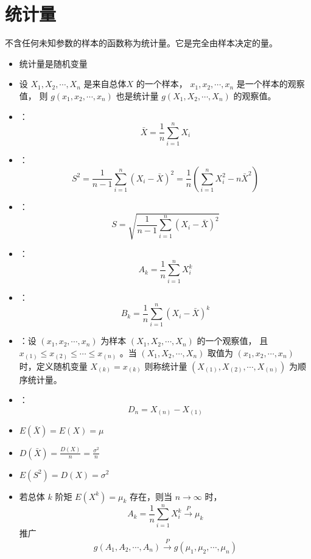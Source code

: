\section{统计量}

 不含任何未知参数的样本的函数称为统计量。它是完全由样本决定的量。
\begin{itemize}[leftmargin=\paritemindent]
    \item 统计量是随机变量
    \item 设 $ X_1, X_2, \cdots, X_n $ 是来自总体$ X $ 的一个样本， $ x_1, x_2, \cdots, x_n $ 是一个样本的观察值，
    则 $ g(x_1, x_2, \cdots, x_n) $ 也是统计量 $ g(X_1, X_2, \cdots, X_n) $ 的观察值。
\end{itemize}

\begin{itemize}[leftmargin=\paritemindent]
    \item {}：
    $$ \bar{X} = \frac{1}{n} \sum_{i=1}^{n} X_i $$
    \item {}：
    $$ S^2 = \frac{1}{n-1} \sum_{i=1}^{n} (X_i - \bar{X})^2 = \frac{1}{n} \left( \sum_{i=1}^{n} X_i^2 - n\bar{X}^2 \right) $$
    \item {}：
    $$ S = \sqrt{\frac{1}{n-1} \sum_{i=1}^{n} (X_i - \bar{X})^2} $$
    \item {}：
    $$ A_k = \frac{1}{n} \sum_{i=1}^{n} X_i^k $$
    \item {}：
    $$ B_k = \frac{1}{n} \sum_{i=1}^{n} (X_i - \bar{X})^k $$
    \item {}：设 $ (x_1, x_2, \cdots, x_n) $ 为样本 $ (X_1, X_2, \cdots, X_n) $ 的一个观察值，
    且 $ x_{(1)} \leqslant x_{(2)} \leqslant \cdots \leqslant x_{(n)} $ 。当 $ (X_1, X_2, \cdots, X_n) $ 取值为
    $ (x_1, x_2, \cdots, x_n) $ 时，定义随机变量 $ X_{(k)} = x_{(k)} $ 则称统计量 $ (X_{(1)}, X_{(2)}, \cdots, X_{(n)}) $
    为顺序统计量。
    \item {}：
    $$ D_n = X_{(n)} - X_{(1)} $$
\end{itemize}

\begin{itemize}[leftmargin=\paritemindent]
    \item $ E(\bar{X}) = E(X) = \mu $
    \item $ D(\bar{X}) = \frac{D(X)}{n} = \frac{\sigma^2}{n} $
    \item $ E(S^2) = D(X) = \sigma^2 $
    \item 若总体 $ k $ 阶矩 $ E(X^k) = \mu_k $ 存在，则当 $ n \rightarrow \infty $ 时，
    \begin{equation}
        A_k = \frac{1}{n} \sum_{i=1}^{n} X_i^k \xrightarrow{P} \mu_k
    \end{equation}
    推广
    \begin{equation}
        g(A_1, A_2, \cdots, A_n) \xrightarrow{P} g(\mu_1, \mu_2, \cdots, \mu_n)
    \end{equation}
\end{itemize}

